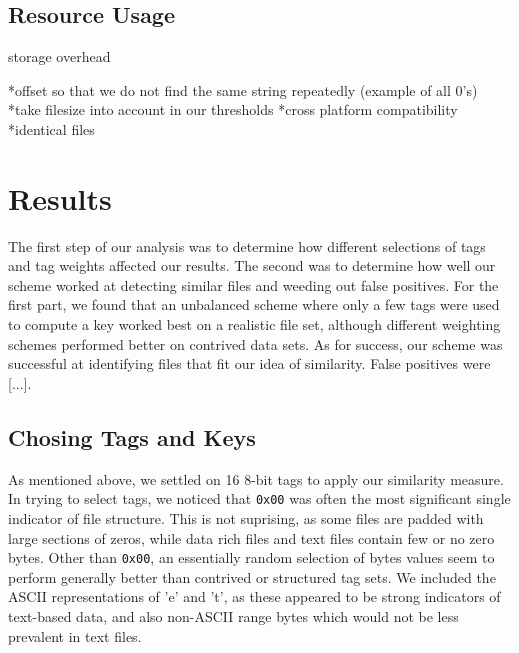 \documentclass[10pt, twocolumn]{article}
\begin{document}
\subsection{Resource Usage}

storage overhead

*offset so that we do not find the same string repeatedly (example of all 0's) 
*take filesize into account in our thresholds 
*cross platform compatibility
*identical files




\section{Results}

The first step of our analysis was to determine how different selections of tags and tag weights affected our results.  The second was to determine how well our scheme worked at detecting similar files and weeding out false positives.  For the first part, we found that an unbalanced scheme where only a few tags were used to compute a key worked best on a realistic file set, although different weighting schemes performed better on contrived data sets.  As for success, our scheme was successful at identifying files that fit our idea of similarity.  False positives were [...].

\subsection{Chosing Tags and Keys}

As mentioned above, we settled on 16 8-bit tags to apply our similarity measure.  In trying to select tags, we noticed that {\tt 0x00} was often the most significant single indicator of file structure.  This is not suprising, as some files are padded with large sections of zeros, while data rich files and text files contain few or no zero bytes.  Other than {\tt 0x00}, an essentially random selection of bytes values seem to perform generally better than contrived or structured tag sets.  We included the ASCII representations of 'e' and 't', as these appeared to be strong indicators of text-based data, and also non-ASCII range bytes which would not be less prevalent in text files.
\end{document}
